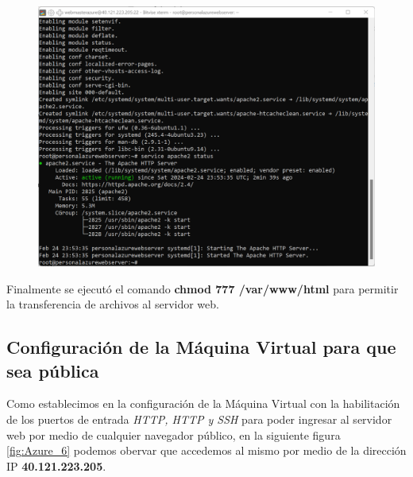 \documentclass[12pt,a4paper]{article}
\begin{document}
\begin{figure}[H]
    \centering
    \includegraphics[width=1\linewidth]{M4_Servicios_Cómputo_en_la_Nube/Tarea_5_Creación_Máquinas_Virtuales_en_Nube/reporte/figuras/1_2_2_PHP_servidor_Web.png}
    \label{fig:Azure_5}
\end{figure}

Finalmente se ejecutó el comando \textbf{chmod 777 /var/www/html} para permitir la transferencia de archivos al servidor web.

\subsection{Configuración de la Máquina Virtual para que sea pública}

Como establecimos en la configuración de la Máquina Virtual con la habilitación de los  puertos de entrada \textit{HTTP, HTTP y SSH} para poder ingresar al servidor web por medio de cualquier navegador público, en la siguiente figura \ref{fig:Azure_6} podemos obervar que accedemos al mismo por medio de la dirección IP \textbf{40.121.223.205}.
\end{document}
